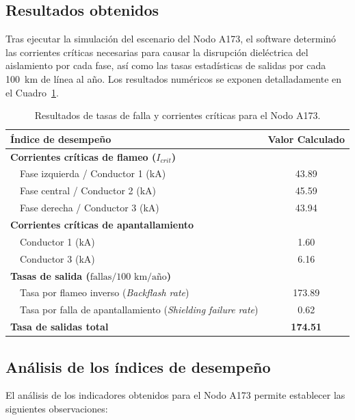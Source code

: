\documentclass[12pt,letterpaper]{article}
\begin{document}
\subsection{Resultados obtenidos}

Tras ejecutar la simulación del escenario del Nodo A173, el software determinó las corrientes críticas necesarias para causar la disrupción dieléctrica del aislamiento por cada fase, así como las tasas estadísticas de salidas por cada 100~km de línea al año. Los resultados numéricos se exponen detalladamente en el Cuadro~\ref{tab:resultados_flash_A173}.

\begin{table}[H]
	\centering
	\caption{Resultados de tasas de falla y corrientes críticas para el Nodo A173.}
	\label{tab:resultados_flash_A173}
	\begin{tabular}{lc}
		\toprule
		\textbf{Índice de desempeño} & \textbf{Valor Calculado} \\
		\midrule
		\textbf{Corrientes críticas de flameo ($I_{crit}$)} & \\
		~~Fase izquierda / Conductor 1 (kA) & 43.89 \\
		~~Fase central / Conductor 2 (kA) & 45.59 \\
		~~Fase derecha / Conductor 3 (kA) & 43.94 \\
		\midrule
		\textbf{Corrientes críticas de apantallamiento} & \\
		~~Conductor 1 (kA) & 1.60 \\
		~~Conductor 3 (kA) & 6.16 \\
		\midrule
		\textbf{Tasas de salida ($\text{fallas/100 km/año}$)} & \\
		~~Tasa por flameo inverso (\textit{Backflash rate}) & 173.89 \\
		~~Tasa por falla de apantallamiento (\textit{Shielding failure rate}) & 0.62 \\
		\midrule
		\textbf{Tasa de salidas total} & \textbf{174.51} \\
		\bottomrule
	\end{tabular}
\end{table}

\subsection{Análisis de los índices de desempeño}

El análisis de los indicadores obtenidos para el Nodo A173 permite establecer las siguientes observaciones:
\end{document}
